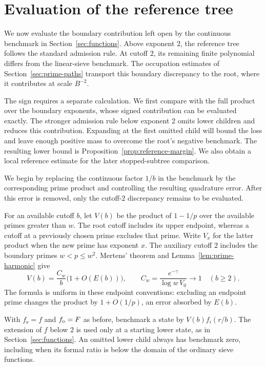 \section{Evaluation of the reference tree}\label{sec:reference}

We now evaluate the boundary contribution left open by the continuous
benchmark in Section~\ref{sec:functions}.  Above exponent $2$, the
reference tree follows the standard admission rule.  At cutoff $2$,
its remaining finite polynomial differs from the linear-sieve benchmark.
The occupation estimates of Section~\ref{sec:prime-paths} transport this
boundary discrepancy to the root, where it contributes at scale $B^{-2}$.

The sign requires a separate calculation.  We first compare with the
full product over the boundary exponents, whose signed contribution can
be evaluated exactly.  The stronger admission rule below exponent $2$
omits lower children and reduces this contribution.  Expanding at the
first omitted child will bound the loss and leave enough positive mass
to overcome the root's negative benchmark.  The resulting lower bound
is Proposition~\ref{prop:reference-margin}.  We also obtain a local
reference estimate for the later stopped-subtree comparison.

We begin by replacing the continuous factor $1/b$ in the benchmark by
the corresponding prime product and controlling the resulting quadrature
error.  After this error is removed, only the cutoff-$2$ discrepancy
remains to be evaluated.

For an available cutoff $b$, let $V(b)$ be the product of $1-1/p$ over
the available primes greater than $w$.  The root cutoff includes its
upper endpoint, whereas a cutoff at a previously chosen prime excludes
that prime.  Write $V_x$ for the latter product when the new prime has
exponent $x$.  The auxiliary cutoff $2$ includes the boundary primes
$w<p\leq w^2$.  Mertens' theorem and Lemma~\ref{lem:prime-harmonic} give
\begin{equation}\label{eq:ref-product}
 V(b)=\frac{C_w}{b}\bigl(1+O(E(b))\bigr),\qquad
 C_w=\frac{e^{-\gamma}}{\log w\,V_0}\longrightarrow1
 \quad(b\geq2).
\end{equation}
The formula is uniform in these endpoint conventions: excluding an
endpoint prime changes the product by $1+O(1/p)$, an error absorbed
by $E(b)$.

With $f_\ee=f$ and $f_\mathrm o=F$ as before, benchmark a state by
$V(b)f_i(r/b)$.  The extension of $f$ below $2$ is used only at a
starting lower state, as in Section~\ref{sec:functions}.  An omitted
lower child always has benchmark zero, including when its formal ratio
is below the domain of the ordinary sieve functions.

